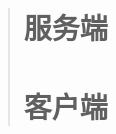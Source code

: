 \documentclass[a4paper,12pt]{article}
\begin{document}
\begin{quote}
\section{服务端}
 
\section{客户端}

\end{quote}
\end{document}
